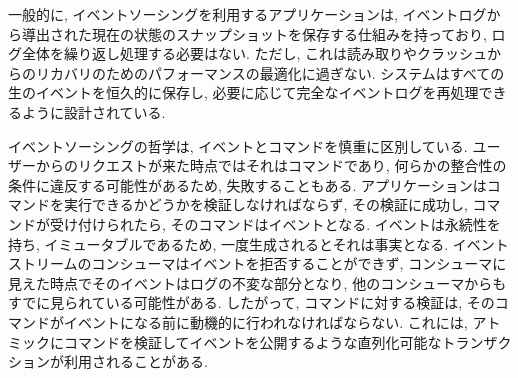 \documentclass[../../../main]{subfiles}
\begin{document}
    一般的に, イベントソーシングを利用するアプリケーションは, イベントログから導出された現在の状態のスナップショットを保存する仕組みを持っており, ログ全体を繰り返し処理する必要はない. ただし, これは読み取りやクラッシュからのリカバリのためのパフォーマンスの最適化に過ぎない. システムはすべての生のイベントを恒久的に保存し, 必要に応じて完全なイベントログを再処理できるように設計されている.

    イベントソーシングの哲学は, イベントとコマンドを慎重に区別している. ユーザーからのリクエストが来た時点ではそれはコマンドであり, 何らかの整合性の条件に違反する可能性があるため, 失敗することもある. アプリケーションはコマンドを実行できるかどうかを検証しなければならず, その検証に成功し, コマンドが受け付けられたら, そのコマンドはイベントとなる. イベントは永続性を持ち, イミュータブルであるため, 一度生成されるとそれは事実となる. イベントストリームのコンシューマはイベントを拒否することができず, コンシューマに見えた時点でそのイベントはログの不変な部分となり, 他のコンシューマからもすでに見られている可能性がある. したがって, コマンドに対する検証は, そのコマンドがイベントになる前に動機的に行われなければならない. これには, アトミックにコマンドを検証してイベントを公開するような直列化可能なトランザクションが利用されることがある. \cite{DB指向イベントソーシング}
\end{document}
